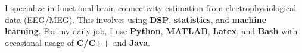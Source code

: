 \begin{cventries}
    \begin{flushleft}
        I specialize in functional brain connectivity estimation from electrophysiological data (EEG/MEG). This involves using \textbf{DSP}, \textbf{statistics}, and \textbf{machine learning}.
        For my daily job, I use \textbf{Python}, \textbf{MATLAB}, \textbf{Latex}, and \textbf{Bash} with occasional usage of \textbf{C/C++} and \textbf{Java}.
    \end{flushleft}
\end{cventries}
